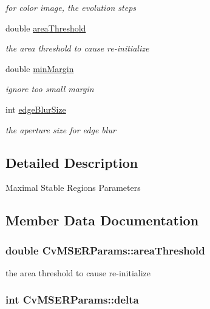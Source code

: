 \begin{DoxyCompactItemize}
\begin{DoxyCompactList}\small\item\em for color image, the evolution steps \end{DoxyCompactList}\item 
double \hyperlink{structCvMSERParams_a2da123e24b459290065e7714bd7c1833}{area\-Threshold}
\begin{DoxyCompactList}\small\item\em the area threshold to cause re-\/initialize \end{DoxyCompactList}\item 
double \hyperlink{structCvMSERParams_ad06b0684eab5f764baf1ddcb9627dbe0}{min\-Margin}
\begin{DoxyCompactList}\small\item\em ignore too small margin \end{DoxyCompactList}\item 
int \hyperlink{structCvMSERParams_a968af0c998169f789c72f7c1320fd029}{edge\-Blur\-Size}
\begin{DoxyCompactList}\small\item\em the aperture size for edge blur \end{DoxyCompactList}\end{DoxyCompactItemize}


\subsection{Detailed Description}
Maximal Stable Regions Parameters 

\subsection{Member Data Documentation}
\hypertarget{structCvMSERParams_a2da123e24b459290065e7714bd7c1833}{
\subsubsection[{area\-Threshold}]{\setlength{\rightskip}{0pt plus 5cm}double Cv\-M\-S\-E\-R\-Params\-::area\-Threshold}}\label{structCvMSERParams_a2da123e24b459290065e7714bd7c1833}


the area threshold to cause re-\/initialize 

\hypertarget{structCvMSERParams_a9a8574af934f1efe0aacb610fd273f04}{
\subsubsection[{delta}]{\setlength{\rightskip}{0pt plus 5cm}int Cv\-M\-S\-E\-R\-Params\-::delta}}\label{structCvMSERParams_a9a8574af934f1efe0aacb610fd273f04}


